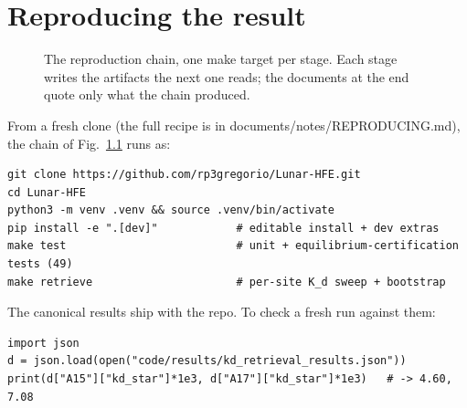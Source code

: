 \documentclass[11pt]{report}
\newcommand{\code}[1]{{\ttfamily\small #1}}
\begin{document}
\medskip
{}

\appendix
\chapter{Reproducing the result}\label{app:repro}

\begin{figure}[htbp]\centering

\caption{The reproduction chain, one \code{make} target per stage. Each stage
writes the artifacts the next one reads; the documents at the end quote only
what the chain produced.}
\label{fig:makeflow}
\end{figure}

\noindent From a fresh clone (the full recipe is in \code{documents/notes/REPRODUCING.md}),
the chain of Fig.~\ref{fig:makeflow} runs as:
\begin{lstlisting}[style=py]
git clone https://github.com/rp3gregorio/Lunar-HFE.git
cd Lunar-HFE
python3 -m venv .venv && source .venv/bin/activate
pip install -e ".[dev]"            # editable install + dev extras
make test                          # unit + equilibrium-certification tests (49)
make retrieve                      # per-site K_d sweep + bootstrap
\end{lstlisting}

\noindent The canonical results ship with the repo. To check a fresh run against
them:
\begin{lstlisting}[style=py]
import json
d = json.load(open("code/results/kd_retrieval_results.json"))
print(d["A15"]["kd_star"]*1e3, d["A17"]["kd_star"]*1e3)   # -> 4.60, 7.08
\end{lstlisting}
\end{document}
